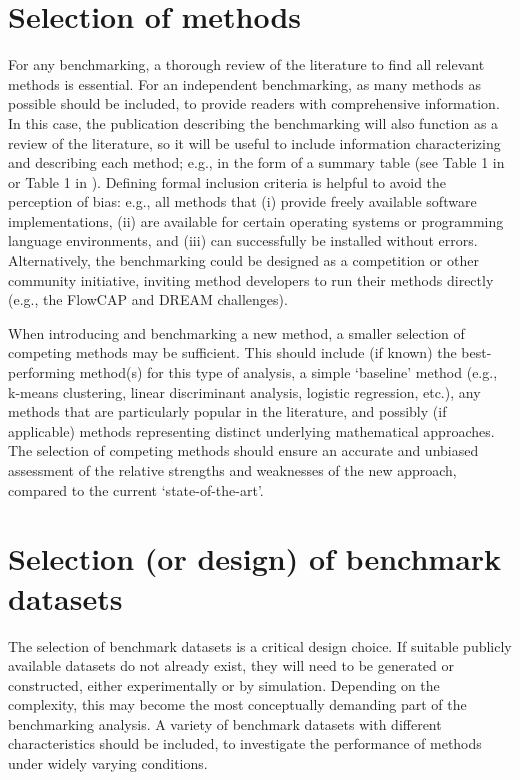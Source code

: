 \documentclass[12pt, a4paper]{article}
\begin{document}
\section*{Selection of methods}

For any benchmarking, a thorough review of the literature to find all relevant methods is essential. For an independent benchmarking, as many methods as possible should be included, to provide readers with comprehensive information. In this case, the publication describing the benchmarking will also function as a review of the literature, so it will be useful to include information characterizing and describing each method; e.g., in the form of a summary table (see Table 1 in \citep{Weber2016} or Table 1 in \citep{Saelens2018b}). Defining formal inclusion criteria is helpful to avoid the perception of bias: e.g., all methods that (i) provide freely available software implementations, (ii) are available for certain operating systems or programming language environments, and (iii) can successfully be installed without errors. Alternatively, the benchmarking could be designed as a competition or other community initiative, inviting method developers to run their methods directly (e.g., the FlowCAP \citep{Aghaeepour2013, Aghaeepour2016} and DREAM \citep{Eduati2015} challenges).

When introducing and benchmarking a new method, a smaller selection of competing methods may be sufficient. This should include (if known) the best-performing method(s) for this type of analysis, a simple `baseline' method (e.g., k-means clustering, linear discriminant analysis, logistic regression, etc.), any methods that are particularly popular in the literature, and possibly (if applicable) methods representing distinct underlying mathematical approaches. The selection of competing methods should ensure an accurate and unbiased assessment of the relative strengths and weaknesses of the new approach, compared to the current `state-of-the-art'.




\section*{Selection (or design) of benchmark datasets}

The selection of benchmark datasets is a critical design choice. If suitable publicly available datasets do not already exist, they will need to be generated or constructed, either experimentally or by simulation. Depending on the complexity, this may become the most conceptually demanding part of the benchmarking analysis. A variety of benchmark datasets with different characteristics should be included, to investigate the performance of methods under widely varying conditions.
\end{document}
